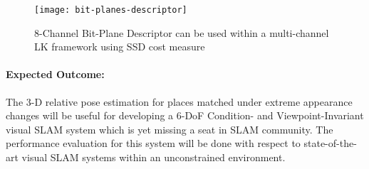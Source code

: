 \documentclass{article}
\begin{document}
\begin{figure}[htbp]
 \centering
 \texttt{[image: bit-planes-descriptor]}
 \caption{8-Channel Bit-Plane Descriptor can be used within a multi-channel LK framework using SSD cost measure \cite{alismail2016bit}}
 \label{fig:bit-plane-descriptor}
\end{figure}

\paragraph{Expected Outcome:}
The 3-D relative pose estimation for places matched under extreme appearance changes will be useful for developing a 6-DoF Condition- and Viewpoint-Invariant visual SLAM system which is yet missing a seat in SLAM community. The performance evaluation for this system will be done with respect to state-of-the-art visual SLAM systems within an unconstrained environment.

% 
% 
\end{document}
